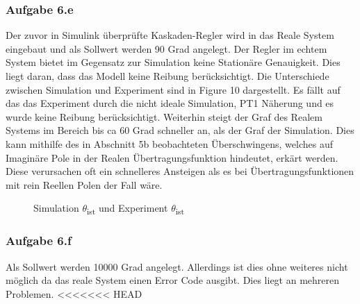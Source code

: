 \documentclass[10pt]{scrartcl}
\begin{document}
\subsubsection{Aufgabe 6.e}	
Der zuvor in Simulink überprüfte Kaskaden-Regler wird in das Reale System eingebaut und als Sollwert werden 90 Grad angelegt. Der Regler im echtem System bietet im Gegensatz zur Simulation keine Stationäre Genauigkeit. Dies liegt daran, dass das Modell keine Reibung berücksichtigt.
Die Unterschiede zwischen Simulation und Experiment sind in Figure 10 dargestellt. Es fällt auf das das Experiment durch die nicht ideale Simulation, PT1 Näherung und es wurde keine Reibung berücksichtigt. Weiterhin steigt der Graf des Realem Systems im Bereich bis ca 60 Grad schneller an, als der Graf der Simulation. Dies kann mithilfe des in Abschnitt 5b beobachteten Überschwingens, welches auf Imaginäre Pole in der Realen Übertragungsfunktion hindeutet, erkärt werden. Diese verursachen oft ein schnelleres Ansteigen als es bei Übertragungsfunktionen mit rein Reellen Polen der Fall wäre.\\
\begin{figure} [H]
\caption{ Simulation $\theta$\textsubscript{ist} und Experiment $\theta$\textsubscript{ist}  } 
\end{figure}
\subsubsection{Aufgabe 6.f}	
Als Sollwert werden 10000 Grad angelegt.
Allerdings ist dies ohne weiteres nicht möglich da das reale System einen Error Code ausgibt. 
Dies liegt an mehreren Problemen.
<<<<<<< HEAD
\end{document}
